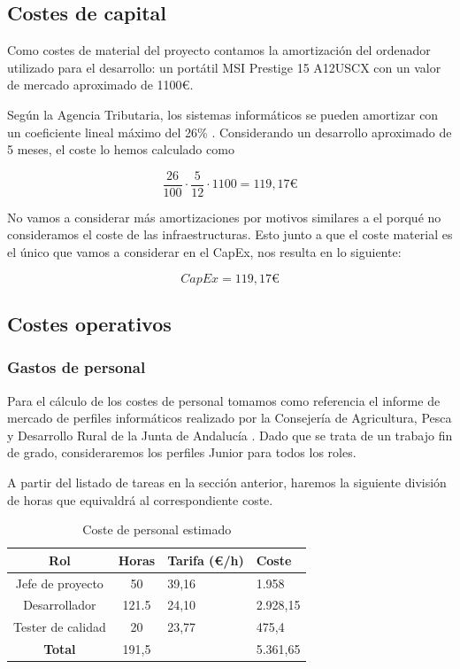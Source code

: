 \subsection{Costes de capital}

Como costes de material del proyecto contamos la amortización del ordenador utilizado para el desarrollo: un portátil MSI Prestige 15 A12USCX con un valor de mercado aproximado de 1100€.

Según la Agencia Tributaria, los sistemas informáticos se pueden amortizar con un coeficiente lineal máximo del 26\% \cite{agencia-tributaria-amortizacion}. Considerando un desarrollo aproximado de 5 meses, el coste lo hemos calculado como

\[ \frac{26}{100} \cdot \frac{5}{12} \cdot 1100 = 119,17 €  \]

No vamos a considerar más amortizaciones por motivos similares a el porqué no consideramos el coste de las infraestructuras. Esto junto a que el coste material es el único que vamos a considerar en el CapEx, nos resulta en lo siguiente:

\[ CapEx = 119,17 € \]

\subsection{Costes operativos}

\subsubsection{Gastos de personal}

Para el cálculo de los costes de personal tomamos como referencia el informe de mercado de perfiles informáticos realizado por la Consejería de Agricultura, Pesca y Desarrollo Rural de la Junta de Andalucía \cite{precios}. Dado que se trata de un trabajo fin de grado, consideraremos los perfiles Junior para todos los roles.

A partir del listado de tareas en la sección anterior, haremos la siguiente división de horas que equivaldrá al correspondiente coste.

\begin{table}[!ht]
    \centering
    \begin{tabular}{ccll}\toprule
        \textbf{Rol}& \textbf{Horas}& \textbf{Tarifa (€/h)}&\textbf{Coste}\\\midrule
        Jefe de proyecto& 50& 39,16&1.958\\
        Desarrollador&  121.5& 24,10&2.928,15\\
        Tester de calidad&  20& 23,77&475,4\\ \hline
        \textbf{Total}& 191,5& &5.361,65\\ \bottomrule
    \end{tabular}
    \caption{Coste de personal estimado}
    \label{tab:coste-personal}
\end{table}

